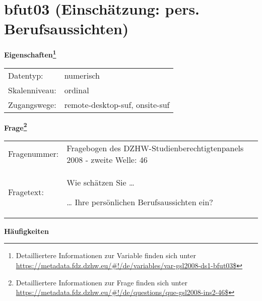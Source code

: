 
    \setcounter{footnote}{0}

    \vspace*{-1.8cm}
	\section{bfut03 (Einschätzung: pers. Berufsaussichten)}
	\label{section:bfut03}



    \vspace*{0.5cm}
    \noindent\textbf{Eigenschaften\footnote{Detailliertere Informationen zur Variable finden sich unter
		\url{https://metadata.fdz.dzhw.eu/\#!/de/variables/var-gsl2008-ds1-bfut03$}}}\\
	\begin{tabularx}{\hsize}{@{}lX}
	Datentyp: & numerisch \\
	Skalenniveau: & ordinal \\
	Zugangswege: &
	  remote-desktop-suf, 
	  onsite-suf
 \\
    \end{tabularx}



				\vspace*{0.5cm}
                \noindent\textbf{Frage\footnote{Detailliertere Informationen zur Frage finden sich unter
		              \url{https://metadata.fdz.dzhw.eu/\#!/de/questions/que-gsl2008-ins2-46$}}}\\
				\begin{tabularx}{\hsize}{@{}lX}
					Fragenummer: &
					  Fragebogen des DZHW-Studienberechtigtenpanels 2008 - zweite Welle:
					  46
 \\
					Fragetext: & Wie schätzen Sie …\par  … Ihre persönlichen Berufsaussichten ein? \\
				\end{tabularx}





        		\vspace*{0.5cm}
                \noindent\textbf{Häufigkeiten}

